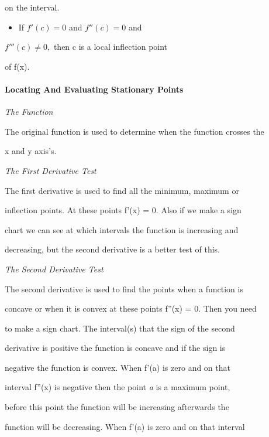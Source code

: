     on the interval.

\begin{itemize}
    \item If $f' \left ( c \right ) = 0$ and $f'' \left ( c \right ) = 0$ and
\end{itemize}
    $f''' \left ( c \right ) \ne 0,$ then c is a local inflection point

    of f(x).



\paragraph{Locating And Evaluating Stationary Points}



\textit{The Function}



The original function is used to determine when the function crosses the

x and y axis's.



\textit{The First Derivative Test}



The first derivative is used to find all the minimum, maximum or

inflection points. At these points f'(x) = 0. Also if we make a sign

chart we can see at which intervals the function is increasing and

decreasing, but the second derivative is a better test of this.



\textit{The Second Derivative Test}



The second derivative is used to find the points when a function is

concave or when it is convex at these points f''(x) = 0. Then you need

to make a sign chart. The interval(s) that the sign of the second

derivative is positive the function is concave and if the sign is

negative the function is convex. When f'(a) is zero and on that

interval f''(x) is negative then the point \textit{a} is a maximum point,

before this point the function will be increasing afterwards the

function will be decreasing. When f'(a) is zero and on that interval

